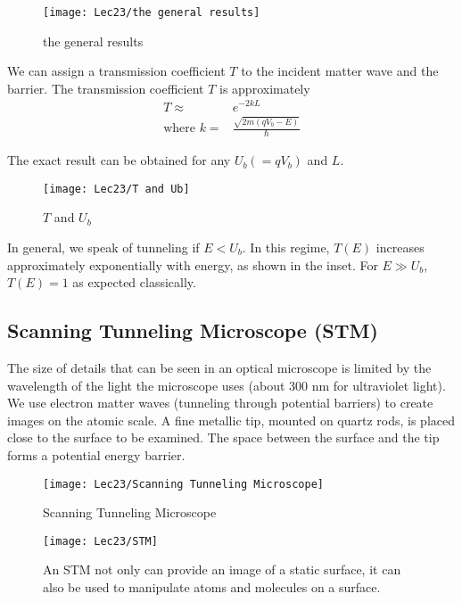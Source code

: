 \begin{figure}[H]
    \centering
    \texttt{[image: Lec23/the general results]}
    \caption{the general results}
\end{figure}

We can assign a transmission coefficient $T$ to the incident matter wave and the barrier. The transmission coefficient $T$ is approximately
\begin{align*}
    T\approx& e^{-2kL}\\
    \text{where } k=&\frac{\sqrt{2m(qV_b-E)}}{\hbar}
\end{align*}

The exact result can be obtained for any $U_b (=qV_b)$ and $L$. 

\begin{figure}[H]
    \centering
    \texttt{[image: Lec23/T and Ub]}
    \caption{$T$ and $U_b$}
\end{figure}

In general, we speak of tunneling if $E<U_b$. In this regime, $T(E)$ increases approximately exponentially with energy, as shown in the inset. For $E\gg U_b$, $T(E)=1$ as expected classically. 

\subsection{Scanning Tunneling Microscope (STM)}
The size of details that can be seen in an optical microscope is limited by the wavelength of the light the microscope uses (about 300 nm for ultraviolet light). We use electron matter waves (tunneling through potential barriers) to create images on the atomic scale. A fine metallic tip, mounted on quartz rods, is placed close to the surface to be examined. The space between the surface and the tip forms a potential energy barrier.

\begin{figure}[H]
    \centering
    \texttt{[image: Lec23/Scanning Tunneling Microscope]}
    \caption{Scanning Tunneling Microscope}
\end{figure}

\begin{figure}[H]
    \centering
    \texttt{[image: Lec23/STM]}
    \caption{An STM not only can provide an image of a static surface, it can also be used to manipulate atoms and molecules on a surface. }
\end{figure}

